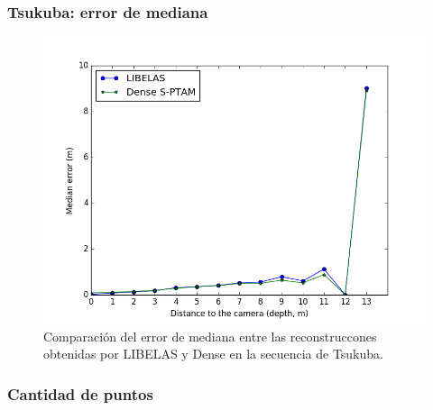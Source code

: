\documentclass[compress]{beamer}
\begin{document}
\begin{frame}
	\frametitle{Tsukuba: error de mediana}
	\begin{figure}[!htb]
		\centering
		\includegraphics[width=0.8\columnwidth]{images/medians_comparison_tsukuba}
		\caption{Comparación del error de mediana entre las reconstruccones obtenidas por LIBELAS y Dense en la secuencia de Tsukuba.}
		\label{fig:median_comparison_tsukuba}
	\end{figure}
\end{frame}

\begin{frame}
	\frametitle{Cantidad de puntos}
	\begin{figure}[!htb]
		\centering
		\hfil
	\end{figure}
\end{frame}
	
\end{document}
